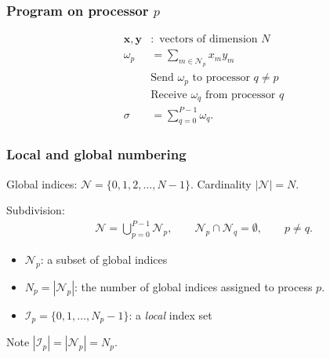 \begin{frame}
\begin{center}
  \end{center}
\end{frame}

\begin{frame}
  \frametitle{Program on processor $p$}
  \begin{align*}
    \bm x, \bm y &: \text{ vectors of dimension } N \\
    \omega_p &= \sum_{m \in \mathcal{N}_p} x_m y_m \\
                 & \text{Send } \omega_p  \text{ to processor } q \not= p \\
                 & \text{Receive } \omega_q  \text{ from processor } q \\
    \sigma &= \sum_{q=0}^{P-1} \omega_q.
  \end{align*}
\end{frame}

\begin{frame}
  \frametitle{Local and global numbering}
  Global indices: $\mathcal{N} = \{0,1,2,\ldots,N-1\}$.
  Cardinality $|\mathcal{N}| = N$.

  Subdivision:
  \begin{align*}
    \mathcal{N} = \bigcup_{p=0}^{P-1} \mathcal{N}_p, \qquad
    \mathcal{N}_p \cap \mathcal{N}_q = \emptyset, \qquad
    p \not= q.
  \end{align*}

  \begin{itemize}
  \item $\mathcal{N}_p$: a subset of global indices
  \item $N_p = |\mathcal{N}_p|$: the number of global indices assigned to
    process $p$.
  \item $\mathcal{I}_p = \{0,1,\ldots,N_p-1\}$: a \emph{local} index set
  \end{itemize}

  Note $|\mathcal{I}_p| = |\mathcal{N}_p| = N_p$.
\end{frame}

